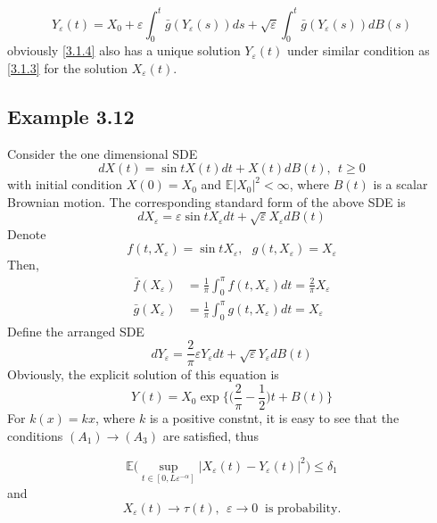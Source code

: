 \documentclass[a4 paper, 12pt]{report}
\theoremstyle{plain}
\begin{document}
\begin{equation}\label{3.1.4}
Y_\varepsilon(t) = X_0+\varepsilon\int_0^{t}\bar{g}(Y_\varepsilon(s))ds+\sqrt{\varepsilon}\int_0^t\bar{g}(Y_\varepsilon(s))dB(s)
\end{equation}
obviously \eqref{3.1.4} also has a unique solution $Y_\varepsilon(t)$ under similar condition as \eqref{3.1.3} for the solution $X_\varepsilon(t)$.
\subsection*{Example 3.12}
Consider the one dimensional SDE
$$
dX(t) = \sin t X(t)dt+X(t)dB(t),~~t\geq 0
$$
with initial condition $X(0)  = X_0$ and $\mathbb{E}|X_0|^2<\infty$, where $B(t)$ is a scalar Brownian motion. The corresponding standard form of the above SDE is
$$
dX_\varepsilon = \varepsilon\sin t X_\varepsilon dt+\sqrt{\varepsilon}X_\varepsilon dB(t)
$$
Denote
$$
f(t,X_\varepsilon) = \sin tX_\varepsilon,~~~g(t,X_\varepsilon) = X_\varepsilon
$$
Then,
\begin{align*}
\bar{f}(X_\varepsilon) & = \frac{1}{\pi}\int_0^\pi f(t,X_\varepsilon)dt = \frac{2}{\pi}X_\varepsilon\\
\bar{g}(X_\varepsilon) & = \frac{1}{\pi}\int_0^\pi g(t,X_\varepsilon)dt = X_\varepsilon
\end{align*}
Define the arranged SDE
$$
dY_\varepsilon = \frac{2}{\pi}\varepsilon Y_\varepsilon dt+\sqrt{\varepsilon}Y_\varepsilon dB(t)
$$
Obviously, the explicit solution of this equation is
$$
Y(t) = X_0\exp\bigg\{\bigg(\frac{2}{\pi} - \frac{1}{2}\bigg)t+B(t)\bigg\}
$$
For $k(x) = kx$, where $k$ is a positive constnt, it is easy to see that the conditions $(A_1)\rightarrow(A_3)$ are satisfied, thus

$$
\mathbb{E}\bigg(\sup_{t\in[0,L \varepsilon^{-\alpha}]}|X_\varepsilon(t) - Y_\varepsilon(t)|^2\bigg)\leq \delta_1
$$
and
$$
X_\varepsilon(t)\rightarrow \tau(t),~~\varepsilon\rightarrow 0~\mbox{  is probability}.
$$
\end{document}
